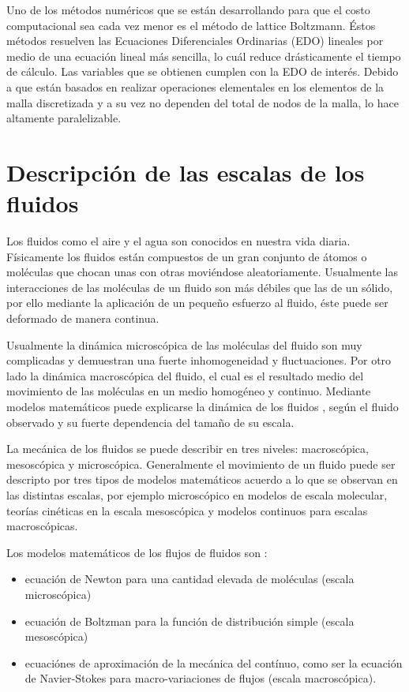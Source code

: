 Uno de los métodos numéricos que se están desarrollando para que el costo computacional sea cada vez menor es el método de lattice Boltzmann. Éstos métodos resuelven las Ecuaciones Diferenciales Ordinarias (EDO) lineales por medio de una ecuación lineal más sencilla, lo cuál reduce drásticamente el tiempo de cálculo. Las variables que se obtienen cumplen con la EDO de interés. Debido a que están basados en realizar operaciones elementales en los elementos de la malla discretizada y a su vez no dependen del total de nodos de la malla, lo hace altamente paralelizable. 

\section{Descripción de las escalas de los fluidos}

Los fluidos como el aire y el agua son conocidos en nuestra vida diaria. Físicamente los fluidos están compuestos de un gran conjunto de átomos o moléculas que chocan unas con otras moviéndose  aleatoriamente. Usualmente las interacciones de las moléculas de un fluido son más débiles que las de un sólido, por ello mediante la aplicación de un pequeño esfuerzo al fluido, éste puede ser deformado de manera continua.


Usualmente la dinámica microscópica de las moléculas del fluido son muy complicadas y demuestran una fuerte inhomogeneidad y fluctuaciones.
Por otro lado la dinámica macroscópica del fluido, el cual es el resultado medio del movimiento de las moléculas en un medio homogéneo y continuo.
Mediante modelos matemáticos puede explicarse la dinámica de los fluidos , según el fluido observado y su fuerte dependencia del tamaño de su escala.

La mecánica de los fluidos se puede describir en tres niveles: macroscópica, mesoscópica y microscópica.
Generalmente el movimiento de un fluido puede ser descripto por tres tipos de modelos matemáticos acuerdo a lo que se observan en las distintas escalas, por ejemplo microscópico en modelos de escala molecular, teorías cinéticas en la escala mesoscópica y modelos continuos para escalas macroscópicas.


Los modelos matemáticos de los flujos de fluidos son :

\begin{itemize}
	\item ecuación de Newton para una cantidad elevada de moléculas (escala microscópica)
	\item ecuación de Boltzman para la función de distribución simple (escala mesoscópica)
	\item ecuaciónes de aproximación de la mecánica del contínuo, como ser la ecuación de Navier-Stokes para macro-variaciones de flujos (escala macroscópica).
\end{itemize}

